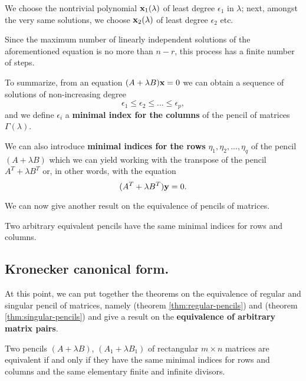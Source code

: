 We choose the nontrivial polynomial \(\vb{x}_{1}(\lambda)\) of least degree \(\epsilon_{1}\) in \(\lambda\); next,
amongst the very same solutions, we choose \(\vb{x}_{2}(\lambda)\) of least degree \(\epsilon_{2}\) etc.

Since the maximum number of linearly independent solutions of the aforementioned equation
is no more than \(n - r\), this process has a finite number of steps.

To summarize, from an equation \((A + \lambda B)\vb{x} = 0\) we can obtain a sequence of solutions of non-increasing degree
\[
    \epsilon_{1} \leq \epsilon_{2} \leq ... \leq \epsilon_{p},
\]
and we define \(\epsilon_{i}\) a \textbf{minimal index for the columns} \cite[p. 38]{gantmacher} of the pencil of matrices
\(\Gamma(\lambda)\).

We can also introduce \textbf{minimal indices for the rows} \cite[p. 38]{gantmacher} \(\eta_{1}, \eta_{2}, ..., \eta_{q}\)
of the pencil \((A + \lambda B)\) which we can yield working with the transpose of the pencil \(A^T + \lambda B^T\)
or, in other words, with the equation
\[
    (A^T + \lambda B^T)\vb{y} = 0.
\]

We can now give another result on the equivalence of pencils of matrices.

\begin{theorem} \cite[p. 39]{gantmacher} \label{thm:singular-pencils}
    Two arbitrary equivalent pencils have the same minimal indices for rows and columns.
\end{theorem}

\subsection*{Kronecker canonical form.}
At this point, we can put together the theorems on the equivalence of regular and singular pencil of matrices, namely
 (theorem \ref{thm:regular-pencils}) and
 (theorem \ref{thm:singular-pencils}) and give a result on the \textbf{equivalence of
arbitrary matrix pairs}.
\begin{theorem}[Kronecker] \cite[p. 40, Theorem 5]{gantmacher} \label{thm:kronecker}
    Two pencils \((A + \lambda B)\), \((A_{1} + \lambda B_{1})\) of rectangular \(m \times n\) matrices
    are equivalent if and only if they have the same minimal indices for rows and columns and the same elementary finite and
    infinite divisors.
\end{theorem}

